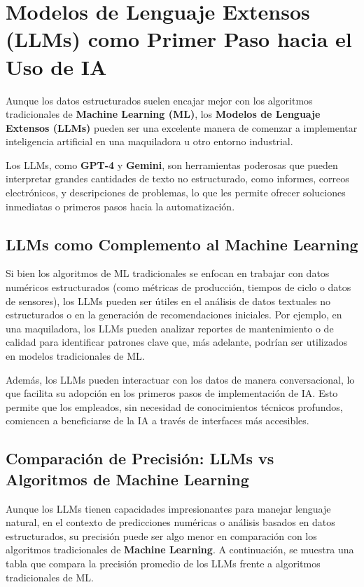 \section{Modelos de Lenguaje Extensos (LLMs) como Primer Paso hacia el Uso de IA}\label{llms-primer-paso-ia}

Aunque los datos estructurados suelen encajar mejor con los algoritmos tradicionales de \textbf{Machine Learning (ML)}, los \textbf{Modelos de Lenguaje Extensos (LLMs)} pueden ser una excelente manera de comenzar a implementar inteligencia artificial en una maquiladora u otro entorno industrial.

Los LLMs, como \textbf{GPT-4} y \textbf{Gemini}, son herramientas poderosas que pueden interpretar grandes cantidades de texto no estructurado, como informes, correos electrónicos, y descripciones de problemas, lo que les permite ofrecer soluciones inmediatas o primeros pasos hacia la automatización.

\subsection{LLMs como Complemento al Machine Learning}
Si bien los algoritmos de ML tradicionales se enfocan en trabajar con datos numéricos estructurados (como métricas de producción, tiempos de ciclo o datos de sensores), los LLMs pueden ser útiles en el análisis de datos textuales no estructurados o en la generación de recomendaciones iniciales. Por ejemplo, en una maquiladora, los LLMs pueden analizar reportes de mantenimiento o de calidad para identificar patrones clave que, más adelante, podrían ser utilizados en modelos tradicionales de ML.

Además, los LLMs pueden interactuar con los datos de manera conversacional, lo que facilita su adopción en los primeros pasos de implementación de IA. Esto permite que los empleados, sin necesidad de conocimientos técnicos profundos, comiencen a beneficiarse de la IA a través de interfaces más accesibles.

\subsection{Comparación de Precisión: LLMs vs Algoritmos de Machine Learning}
Aunque los LLMs tienen capacidades impresionantes para manejar lenguaje natural, en el contexto de predicciones numéricas o análisis basados en datos estructurados, su precisión puede ser algo menor en comparación con los algoritmos tradicionales de \textbf{Machine Learning}. A continuación, se muestra una tabla que compara la precisión promedio de los LLMs frente a algoritmos tradicionales de ML.

